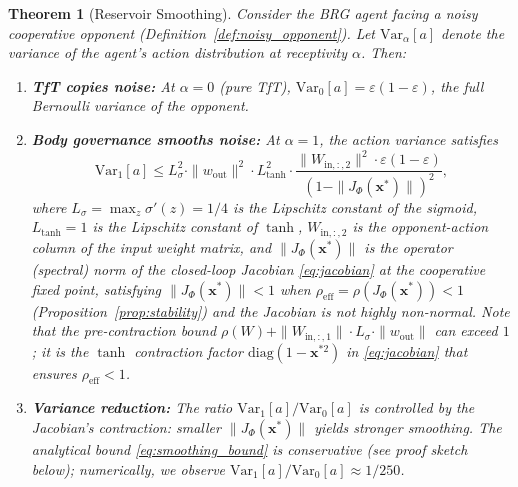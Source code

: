 \documentclass[11pt,a4paper]{article}
\newtheorem{theorem}{Theorem}[section]
\theoremstyle{definition}
\newcommand{\Var}{\mathrm{Var}}
\newcommand{\Wres}{W}
\newcommand{\Wout}{w_{\mathrm{out}}}
\newcommand{\xstate}{\mathbf{x}}
\begin{document}
\begin{theorem}[Reservoir Smoothing]
\label{thm:smoothing}
Consider the BRG agent facing a noisy cooperative opponent
(Definition~\ref{def:noisy_opponent}).  Let $\Var_{\alpha}[a]$ denote the
variance of the agent's action distribution at receptivity $\alpha$.  Then:
\begin{enumerate}[label=(\alph*)]
  \item \textbf{TfT copies noise:}  At $\alpha = 0$ (pure TfT),
    $\Var_0[a] = \varepsilon(1-\varepsilon)$, the full Bernoulli variance
    of the opponent.
  \item \textbf{Body governance smooths noise:}  At $\alpha = 1$, the
    action variance satisfies
    \begin{equation}
    \label{eq:smoothing_bound}
    \Var_1[a] \leq L_{\sigma}^2 \cdot \|\Wout\|^2 \cdot L_{\tanh}^{2} \cdot
    \frac{\|W_{\mathrm{in},{:,2}}\|^2 \cdot \varepsilon(1-\varepsilon)}{(1 - \|J_{\Phi}(\xstate^{*})\|)^2},
    \end{equation}
    where $L_{\sigma} = \max_z \sigma'(z) = 1/4$ is the Lipschitz constant of
    the sigmoid, $L_{\tanh} = 1$ is the Lipschitz constant of $\tanh$,
    $W_{\mathrm{in},{:,2}}$ is the opponent-action column of the input weight matrix, and
    $\|J_{\Phi}(\xstate^{*})\|$ is the operator (spectral) norm of the
    closed-loop Jacobian \eqref{eq:jacobian} at the cooperative fixed point,
    satisfying $\|J_{\Phi}(\xstate^{*})\| < 1$ when
    $\rho_{\mathrm{eff}} = \rho(J_{\Phi}(\xstate^{*})) < 1$
    (Proposition~\ref{prop:stability}) and the Jacobian is not
    highly non-normal.
    Note that the pre-contraction bound
    $\rho(\Wres) + \|W_{\mathrm{in},{:,1}}\| \cdot L_{\sigma} \cdot \|\Wout\|$
    can exceed $1$; it is the $\tanh$ contraction factor
    $\mathrm{diag}(1 - \xstate^{*2})$ in \eqref{eq:jacobian} that
    ensures $\rho_{\mathrm{eff}} < 1$.
  \item \textbf{Variance reduction:}  The ratio
    $\Var_1[a] / \Var_0[a]$ is controlled by the Jacobian's
    contraction: smaller $\|J_{\Phi}(\xstate^{*})\|$ yields stronger smoothing.
    The analytical bound \eqref{eq:smoothing_bound} is conservative
    (see proof sketch below); numerically, we observe
    $\Var_1[a] / \Var_0[a] \approx 1/250$.
\end{enumerate}
\end{theorem}
\end{document}
